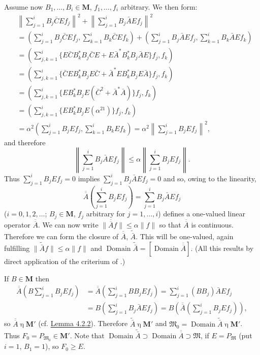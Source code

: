 \documentclass[12pt,b5paper,twoside]{article}
\newcommand{\M}{\mathbf M}
\newcommand{\lemref}[1]{\hyperref[lem:#1]{Lemma #1}}
\begin{document}
Assume now $B_1,\ldots,B_i\in\M$, $f_1,\ldots,f_i$ arbitrary. We then
form:
\begin{align*}
 &\left\lVert\sum_{j=1}^{i}B_j\bar C E f_j\right\rVert^2
 +\left\lVert\sum_{j=1}^{i}B_j\bar A E f_j\right\rVert^2\\
 &=\left(\sum_{j=1}^{i}B_j\bar C E f_j,
          \sum_{k=1}^{i}B_k\bar C E f_k\right)
  +\left(\sum_{j=1}^{i}B_j\bar A E f_j,
          \sum_{k=1}^{i}B_k\bar A E f_k\right)\\
 &=\left(\sum_{j,k=1}^{i}
    \{E\bar C B_k^*B_j\bar C E+E\bar A^*B_k^*B_j\bar A E\}f_j,f_k\right)\\
 &=\left(\sum_{j,k=1}^{i}
    \{\bar CEB_k^*B_jE\bar C+\bar A^*EB_k^*B_jE\bar A\}f_j,f_k\right)\\
 &=\left(\sum_{j,k=1}^{i}
    \{EB_k^*B_jE(\bar C^2+\bar A^*\bar A)\}f_j,f_k\right)\\
 &=\left(\sum_{j,k=1}^{i}\{EB_k^*B_jE(\alpha^21)\}f_j,f_k\right)\\
 &=\alpha^2\left(\sum_{j=1}^{i}B_jEf_j,
                  \sum_{k=1}^{i}B_kEf_k\right)
 =\alpha^2\left\lVert\sum_{j=1}^{i}B_jEf_j\right\rVert^2,
\end{align*}
and therefore
\[
 \left\lVert\sum_{j=1}^{i}B_j\bar A E f_j\right\rVert
 \leq\alpha\left\lVert\sum_{j=1}^{i}B_jE f_j\right\rVert.
\]
Thus $\sum_{j=1}^{i}B_jEf_j=0$ implies
$\sum_{j=1}^{i}B_j\bar A Ef_j=0$ and so, owing to the linearity,
\[
 \overline{\overline A}\left(\sum_{j=1}^{i}B_jEf_j\right)
 =\sum_{j=1}^{i}B_j\bar A Ef_j
\]
($i=0,1,2,\ldots$; $B_j\in\M$, $f_j$ arbitrary for $j=1,\ldots,i$)
defines a one-valued linear operator $\overline{\overline A}$. We can now
write $\lVert\overline{\overline A}f\rVert\leq\alpha\lVert f\rVert$ so
that $\overline{\overline A}$ is continuous. Therefore we can form the
closure of $\overline{\overline A}$, $\widetilde{\bar A}$. This will be
one-valued, again fulfilling
$\lVert\widetilde{\bar A}f\rVert\leq\alpha\lVert f\rVert$ and
$\operatorname{Domain}\widetilde{\bar A}
=[\operatorname{Domain}\overline{\overline A}]$. (All this results by
direct application of the criterium of \cite[p.~300]{ref21}.)

If $B\in\M$ then
\begin{align*}
 \overline{\overline A}\left(B\sum_{j=1}^{i}B_jEf_j\right)
 &=\overline{\overline A}\left(\sum_{j=1}^{i}BB_jEf_j\right)
 =\sum_{j=1}^{i}(BB_j)\bar A Ef_j\\
 &=B\left(\sum_{j=1}^{i}B_j\bar A Ef_j\right)
 =B\left(\overline{\overline A}
           \left(\sum_{j=1}^{i}B_jEf_j\right)\right),
\end{align*}
so $\overline{\overline A}\mathbin\eta\M'$ (cf. \lemref{4.2.2}).
Therefore $\widetilde{\bar A}\mathbin\eta\M'$ and
$\mathfrak M_0=\operatorname{Domain}\widetilde{\bar A}
\mathbin\eta\M'$. Thus $F_0=P_{\mathfrak M_0}\in\M'$. Note that
$\operatorname{Domain}\widetilde{\bar A}\supset
\operatorname{Domain}\overline{\overline A}\supset\mathfrak M$, if
$E=P_{\mathfrak M}$ (put $i=1$, $B_1=1$), so $F_0\geq E$.
\end{document}
